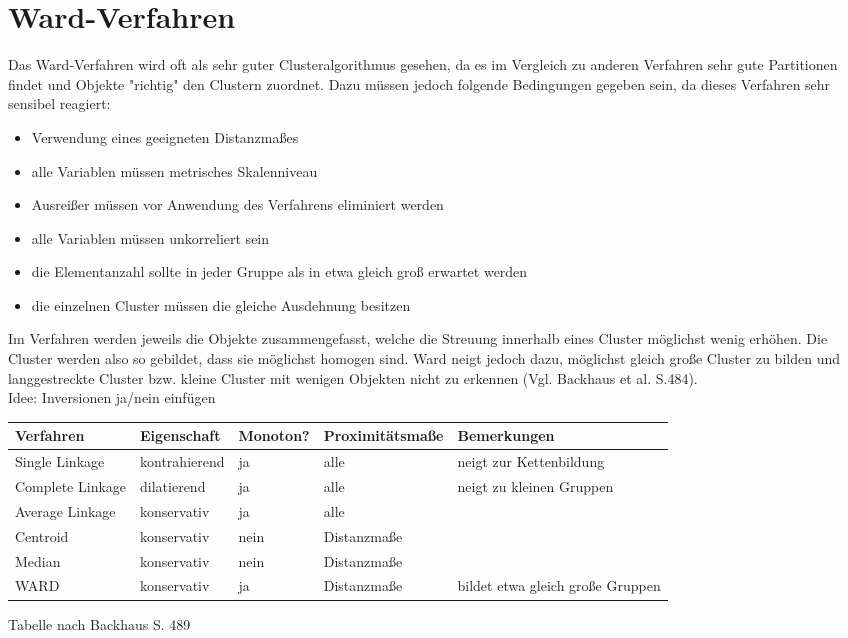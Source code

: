 \section{Ward-Verfahren}
Das Ward-Verfahren wird oft als sehr guter Clusteralgorithmus gesehen, da es im Vergleich zu anderen Verfahren sehr gute Partitionen findet und Objekte "richtig" den Clustern zuordnet. Dazu müssen jedoch folgende Bedingungen gegeben sein, da dieses Verfahren sehr sensibel reagiert: 

\begin{itemize}
	\item Verwendung eines geeigneten Distanzmaßes
	\item alle Variablen müssen metrisches Skalenniveau \item Ausreißer müssen vor Anwendung des Verfahrens eliminiert werden
	\item alle Variablen müssen unkorreliert sein
	\item die Elementanzahl sollte in jeder Gruppe als in etwa gleich groß erwartet werden
	\item die einzelnen Cluster müssen die gleiche Ausdehnung besitzen
\end{itemize}

Im Verfahren werden jeweils die Objekte zusammengefasst, welche die Streuung innerhalb eines Cluster möglichst wenig erhöhen. Die Cluster werden also so gebildet, dass sie möglichst homogen sind. Ward neigt jedoch dazu, möglichst gleich große Cluster zu bilden und langgestreckte Cluster bzw. kleine Cluster mit wenigen Objekten nicht zu erkennen (Vgl. Backhaus et al. \cite{Backhaus.2016} S.484). \\


Idee: Inversionen ja/nein einfügen \\
\begin{tabular}{|l|l|l|l|p{3.7cm}|}
	\hline
	\rowcolor{babyblueeyes}Verfahren & Eigenschaft & Monoton? & Proximitätsmaße & Bemerkungen \\ \hline
	\rowcolor{beaublue}Single Linkage & kontrahierend & ja & alle & neigt zur Kettenbildung \\ \hline
	\rowcolor{beaublue}Complete Linkage & dilatierend & ja & alle & neigt zu kleinen Gruppen \\ \hline	
	\rowcolor{beaublue}Average Linkage & konservativ & ja & alle & \\ \hline
	\rowcolor{beaublue}Centroid & konservativ & nein & Distanzmaße & \\ \hline
	\rowcolor{beaublue}Median & konservativ & nein & Distanzmaße & \\ \hline
	\rowcolor{beaublue}WARD & konservativ & ja & Distanzmaße & bildet etwa gleich große Gruppen \\ \hline
\end{tabular}
Tabelle nach Backhaus S. 489
